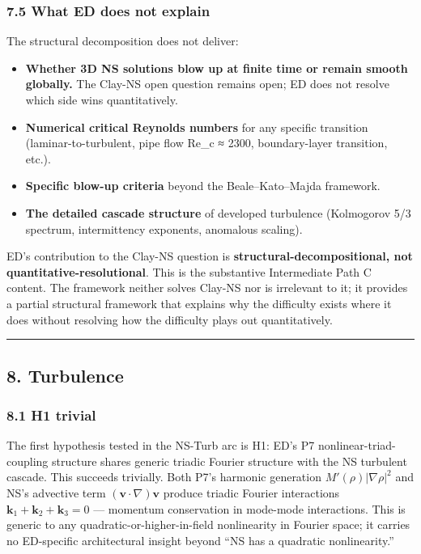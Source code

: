 \documentclass[
  11pt,a4paper]{article}
\providecommand{\tightlist}{%
  \setlength{\itemsep}{0pt}\setlength{\parskip}{0pt}}
\begin{document}
\subsubsection{7.5 What ED does not
explain}\label{what-ed-does-not-explain}

The structural decomposition does not deliver:

\begin{itemize}
\tightlist
\item
  \textbf{Whether 3D NS solutions blow up at finite time or remain
  smooth globally.} The Clay-NS open question remains open; ED does not
  resolve which side wins quantitatively.
\item
  \textbf{Numerical critical Reynolds numbers} for any specific
  transition (laminar-to-turbulent, pipe flow Re\_c ≈ 2300,
  boundary-layer transition, etc.).
\item
  \textbf{Specific blow-up criteria} beyond the Beale--Kato--Majda
  framework.
\item
  \textbf{The detailed cascade structure} of developed turbulence
  (Kolmogorov 5/3 spectrum, intermittency exponents, anomalous scaling).
\end{itemize}

ED's contribution to the Clay-NS question is
\textbf{structural-decompositional, not quantitative-resolutional}. This
is the substantive Intermediate Path C content. The framework neither
solves Clay-NS nor is irrelevant to it; it provides a partial structural
framework that explains why the difficulty exists where it does without
resolving how the difficulty plays out quantitatively.

\begin{center}\rule{0.5\linewidth}{0.5pt}\end{center}

\subsection{8. Turbulence}\label{turbulence}

\subsubsection{8.1 H1 trivial}\label{h1-trivial}

The first hypothesis tested in the NS-Turb arc is H1: ED's P7
nonlinear-triad-coupling structure shares generic triadic Fourier
structure with the NS turbulent cascade. This succeeds trivially. Both
P7's harmonic generation \(M'(\rho)|\nabla\rho|^2\) and NS's advective
term \((\mathbf{v} \cdot \nabla)\mathbf{v}\) produce triadic Fourier
interactions \(\mathbf{k}_1 + \mathbf{k}_2 + \mathbf{k}_3 = 0\) ---
momentum conservation in mode-mode interactions. This is generic to any
quadratic-or-higher-in-field nonlinearity in Fourier space; it carries
no ED-specific architectural insight beyond ``NS has a quadratic
nonlinearity.''
\end{document}
